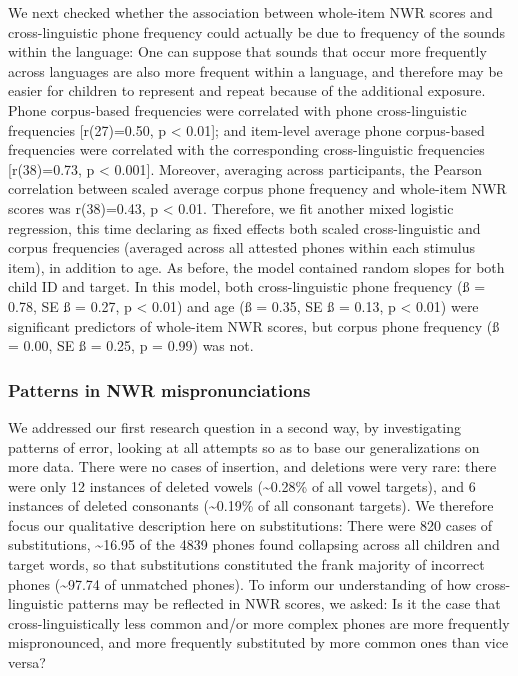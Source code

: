 \documentclass[english,,man,floatsintext]{apa6}
\begin{document}
We next checked whether the association between whole-item NWR scores and cross-linguistic phone frequency could actually be due to frequency of the sounds within the language: One can suppose that sounds that occur more frequently across languages are also more frequent within a language, and therefore may be easier for children to represent and repeat because of the additional exposure. Phone corpus-based frequencies were correlated with phone cross-linguistic frequencies {[}r(27)=0.50, p \textless{} 0.01{]}; and item-level average phone corpus-based frequencies were correlated with the corresponding cross-linguistic frequencies {[}r(38)=0.73, p \textless{} 0.001{]}. Moreover, averaging across participants, the Pearson correlation between scaled average corpus phone frequency and whole-item NWR scores was r(38)=0.43, p \textless{} 0.01. Therefore, we fit another mixed logistic regression, this time declaring as fixed effects both scaled cross-linguistic and corpus frequencies (averaged across all attested phones within each stimulus item), in addition to age. As before, the model contained random slopes for both child ID and target. In this model, both cross-linguistic phone frequency (ß = 0.78, SE ß = 0.27, p \textless{} 0.01) and age (ß = 0.35, SE ß = 0.13, p \textless{} 0.01) were significant predictors of whole-item NWR scores, but corpus phone frequency (ß = 0.00, SE ß = 0.25, p = 0.99) was not.

\hypertarget{patterns-in-nwr-mispronunciations}{%
\subsubsection{Patterns in NWR mispronunciations}\label{patterns-in-nwr-mispronunciations}}

We addressed our first research question in a second way, by investigating patterns of error, looking at all attempts so as to base our generalizations on more data. There were no cases of insertion, and deletions were very rare: there were only 12 instances of deleted vowels (\textasciitilde{}0.28\% of all vowel targets), and 6 instances of deleted consonants (\textasciitilde{}0.19\% of all consonant targets). We therefore focus our qualitative description here on substitutions: There were 820 cases of substitutions, \textasciitilde{}16.95 of the 4839 phones found collapsing across all children and target words, so that substitutions constituted the frank majority of incorrect phones (\textasciitilde{}97.74 of unmatched phones). To inform our understanding of how cross-linguistic patterns may be reflected in NWR scores, we asked: Is it the case that cross-linguistically less common and/or more complex phones are more frequently mispronounced, and more frequently substituted by more common ones than vice versa?
\end{document}

